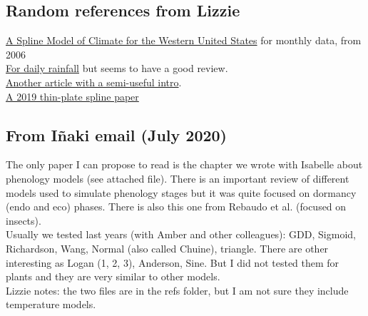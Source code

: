 \documentclass[11pt,letter]{article}
\begin{document}
\subsection{Random references from Lizzie}

\href{https://www.fs.fed.us/rm/pubs/rmrs_gtr165.pdf}{A Spline Model of Climate for the
Western United States} for monthly data, from 2006\\

\href{https://rmets.onlinelibrary.wiley.com/doi/pdf/10.1002/joc.4068}{For daily rainfall} but seems to have a good review. \\

\href{https://agupubs.onlinelibrary.wiley.com/doi/full/10.1002/2013JD020803}{Another article with a semi-useful intro}.\\

\href{https://www.nature.com/articles/sdata2018299}{A 2019 thin-plate spline paper}

\subsection{From I\~naki email (July 2020)}

The only paper I can propose to read is the chapter we wrote with Isabelle about phenology models (see attached file). There is an important review of different models used to simulate phenology stages  but it was quite focused on dormancy (endo and eco) phases. 
There is also this one from Rebaudo et al. (focused on insects).\\

Usually we tested last years (with Amber and other colleagues): GDD, Sigmoid, Richardson, Wang, Normal (also called Chuine), triangle. 
There are other interesting as Logan (1, 2, 3), Anderson, Sine. But I did not tested them for plants and they are very similar to other models. \\

Lizzie notes: the two files are in the refs folder, but I am not sure they include temperature models.
\end{document}
